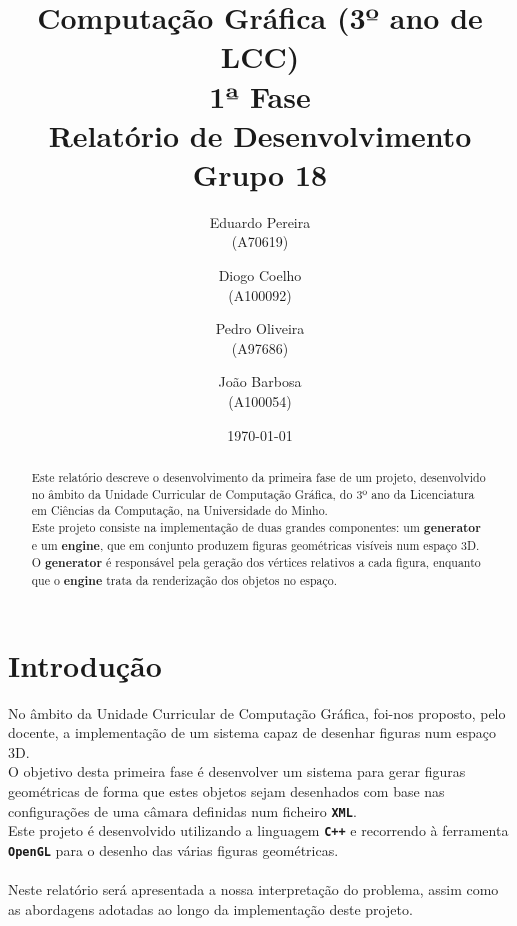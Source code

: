 \documentclass[12pt,a4paper]{report}%
\title{Computação Gráfica (3º ano de LCC)\\
       \textbf{1ª Fase} \\ Relatório de Desenvolvimento\\
       \textbf{ Grupo 18 }
       } %
\author{Eduardo Pereira\\ (A70619) \and Diogo Coelho \\ (A100092)
         \and Pedro Oliveira\\ (A97686) \and João Barbosa\\ (A100054)
       } %
\date{\today} %
\begin{document}
\maketitle %

\begin{abstract}  %

Este relatório descreve o desenvolvimento da primeira fase de um projeto, desenvolvido no âmbito da Unidade Curricular de Computação Gráfica, do 3º ano da Licenciatura em Ciências da Computação, na Universidade do Minho.\newline 
\\ Este projeto consiste na implementação de duas grandes componentes: um \textbf{generator} e um \textbf{engine}, que em conjunto produzem figuras geométricas visíveis num espaço 3D.\\ \newline
O \textbf{generator} é responsável pela geração dos vértices relativos a cada figura, enquanto que o \textbf{engine} trata da renderização dos objetos no espaço. \\
\end{abstract}

\tableofcontents %
\listoffigures %

\chapter{Introdução} \label{chap:intro} %

No âmbito da Unidade Curricular de Computação Gráfica, foi-nos proposto, pelo docente, a implementação de um sistema capaz de desenhar figuras num espaço 3D. \newline
\\ O objetivo desta primeira fase é desenvolver um sistema para gerar figuras geométricas de forma que estes objetos sejam desenhados com base nas configurações de uma câmara definidas num ficheiro  \textbf{\texttt{XML}}.\\
Este projeto é desenvolvido utilizando a linguagem \textbf{\texttt{C++}} e recorrendo à ferramenta \textbf{\texttt{OpenGL}} para o desenho das várias figuras geométricas. \\
\\ Neste relatório será apresentada a nossa interpretação do problema, assim como as abordagens adotadas ao longo da implementação deste projeto.
\\ 
\end{document}

